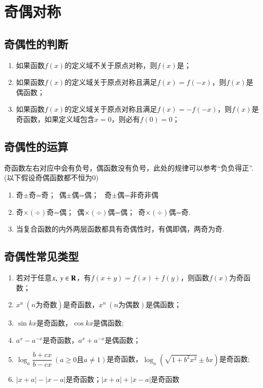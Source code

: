 \documentclass{BHCexam}
\begin{document}
\section{奇偶对称}
\subsection{奇偶性的判断}
\begin{enumerate}[1)]
\item 如果函数$f(x)$的定义域不关于原点对称，则$f(x)$是；
\item 如果函数$f(x)$的定义域关于原点对称且满足$ f(x)=f(-x) $，则$f(x)$是偶函数；
\item 如果函数$f(x)$的定义域关于原点对称且满足$ f(x)=-f(-x) $，则$f(x)$是奇函数，如果定义域包含$ x=0 $，则必有$ f(0)=0 $；
\end{enumerate}



\subsection{奇偶性的运算}
奇函数左右对应中会有负号，偶函数没有负号，此处的规律可以参考“负负得正”.{\kaishu (以下假设奇偶函数都不恒为$ 0 $)}
\begin{enumerate}[1)]
\item 奇$\pm$奇=奇；\  偶$\pm $偶=偶；
\  奇$\pm$偶=非奇非偶 
\item 奇$\times(\div)$奇=偶；\ 偶$\times(\div)$偶=偶；\  奇$\times(\div)$偶=奇.
\item 当复合函数的内外两层函数都具有奇偶性时，有偶即偶，两奇为奇.
\end{enumerate}
\subsection{奇偶性常见类型}
\begin{enumerate}[1)]
\item 若对于任意$ x,~y\in\mathbf{R} $，有$f(x+y)=f(x)+f(y)$，则函数$f(x)$为奇函数；
\item $x^n~(n\text{为奇数})$是奇函数，$x^n~(n\text{为偶数})$是偶函数；
\item $ \sin kx $是奇函数，$ \cos kx $是偶函数;
\item $ a^x-a^{-x} $是奇函数，$ a^x+a^{-x} $是偶函数；
\item $ \log_a\dfrac{b+cx}{b-cx} ~(a\ge 0\text{且}a\ne1)$是奇函数，$ \log_a\left(\sqrt{1+b^2x^2}\pm bx\right) $是奇函数;
\item $ \left|x+a\right|-\left|x-a\right| $是奇函数；$ \left|x+a\right|+\left|x-a\right| $是奇函数
\end{enumerate}
\end{document}
